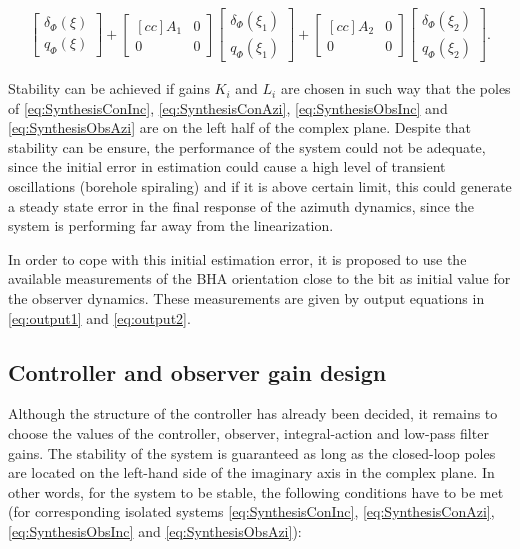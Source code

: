 \documentclass[main.tex]{subfiles}
\begin{document}
\begin{align}
    	\begin{bmatrix}
    	\delta_\Phi (\xi)\\
    	q_\Phi (\xi)
    	\end{bmatrix} + 
    	\begin{bmatrix}[cc]
    	A_1 & 0\\ 
    	0 & 0
    	\end{bmatrix}
    	\begin{bmatrix}
    	\delta_\Phi (\xi_1)\\
    	q_\Phi (\xi_1)
    	\end{bmatrix} + 
    	\begin{bmatrix}[cc]
    	A_2 & 0\\ 
    	0 & 0
    	\end{bmatrix}
    	\begin{bmatrix}
    	\delta_\Phi (\xi_2)\\
    	q_\Phi (\xi_2)
    	\end{bmatrix}. \label{eq:SynthesisObsAzi}
\end{align}

Stability can be achieved if gains $K_i$ and $L_i$ are chosen in such way that the poles of \eqref{eq:SynthesisConInc}, \eqref{eq:SynthesisConAzi}, \eqref{eq:SynthesisObsInc} and \eqref{eq:SynthesisObsAzi} are on the left half of the complex plane. Despite that stability can be ensure, the performance of the system could not be adequate, since the initial error in estimation could cause a high level of transient oscillations (borehole spiraling) and if it is above certain limit, this could generate a steady state error in the final response of the azimuth dynamics, since the system is performing far away from the linearization.

In order to cope with this initial estimation error, it is proposed to use the available measurements of the BHA orientation close to the bit as initial value for the observer dynamics. These measurements are given by output equations in \eqref{eq:output1} and \eqref{eq:output2}.

\subsection{Controller and observer gain design}

Although the structure of the controller has already been decided, it remains to choose the values of the controller, observer, integral-action and low-pass filter gains. The stability of the system is guaranteed as long as the closed-loop poles are located on the left-hand side of the imaginary axis in the complex plane. In other words, for the system to be stable, the following conditions have to be met (for corresponding isolated systems \eqref{eq:SynthesisConInc}, \eqref{eq:SynthesisConAzi}, \eqref{eq:SynthesisObsInc} and \eqref{eq:SynthesisObsAzi}):
\end{document}
